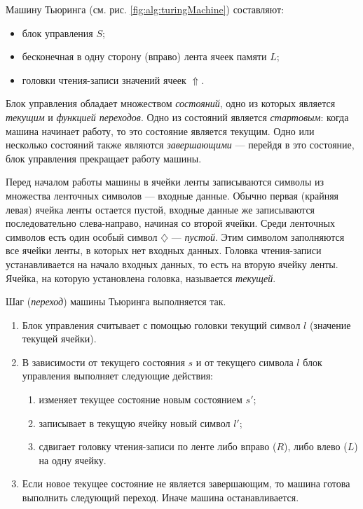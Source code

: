 Машину Тьюринга (см. рис. \ref{fig:alg:turingMachine}) составляют:
\begin{itemize}
    \item блок управления $S$;
    \item бесконечная в одну сторону (вправо) лента ячеек памяти $L$;
    \item головки чтения-записи значений ячеек $\Uparrow$.
\end{itemize}

Блок управления обладает множеством \emph{состояний}, одно из которых является \emph{текущим} и \emph{функцией переходов}. Одно из состояний является \emph{стартовым}: когда машина начинает работу, то это состояние является текущим. Одно или несколько состояний также являются \emph{завершающими} --- перейдя в это состояние, блок управления прекращает работу машины. 

Перед началом работы машины в ячейки ленты записываются символы из множества ленточных символов --- входные данные. Обычно первая (крайняя левая) ячейка ленты остается пустой, входные данные же записываются последовательно слева-направо, начиная со второй ячейки. Среди ленточных символов есть один особый символ $\diamondsuit$ --- \emph{пустой}. Этим символом заполняются все ячейки ленты, в которых нет входных данных. Головка чтения-записи устанавливается на начало входных данных, то есть на вторую ячейку ленты. Ячейка, на которую установлена головка, называется \emph{текущей}.

Шаг (\emph{переход}) машины Тьюринга выполняется так.
\begin{enumerate}
    \item Блок управления считывает с помощью головки текущий символ $l$ (значение текущей ячейки).
    \item В зависимости от текущего состояния $s$ и от текущего символа $l$ блок управления выполняет следующие действия:
    \begin{enumerate}
        \item изменяет текущее состояние новым состоянием $s'$;
        \item записывает в текущую ячейку новый символ $l'$;
        \item сдвигает головку чтения-записи по ленте либо вправо ($R$), либо влево ($L$) на одну ячейку.
    \end{enumerate}
    \item Если новое текущее состояние не является завершающим, то машина готова выполнить следующий переход. Иначе машина останавливается.
\end{enumerate}

